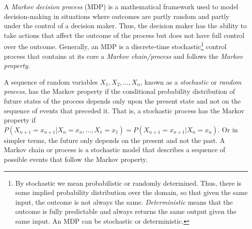 


A \emph{Markov decision process} (MDP) is a mathematical framework used to model decision-making in situations where outcomes are partly random and partly under the control of a decision maker.
Thus, the decision maker has the ability to take actions that affect the outcome of the process but does not have full control over the outcome.
Generally, an MDP is a discrete-time stochastic\footnote{By stochastic we mean probabilistic or randomly determined. Thus, there is some implied probability distribution over the domain, so that given the same input, the outcome is not always the same. \emph{Deterministic} means that the outcome is fully predictable and always returns the same output given the same input. An MDP can be stochastic or deterministic.} control process that contains at its core a \emph{Markov chain/process} and follows the \emph{Markov property}.

A sequence of random variables $X_1,X_2,\ldots,X_n$, known as a \emph{stochastic} or \emph{random process}, has the Markov property if the conditional probability distribution of future states of the process depends only upon the present state and not on the sequence of events that preceded it.
That is, a stochastic process has the Markov property if $P(X_{n+1} = x_{n+1}|X_n = x_n,\ldots,X_1 = x_1) = P(X_{n+1} = x_{n+1}|X_n = x_n)$.
Or in simpler terms, the future only depends on the present and not the past.
A Markov chain or process is a stochastic model that describes a sequence of possible events that follow the Markov property.


